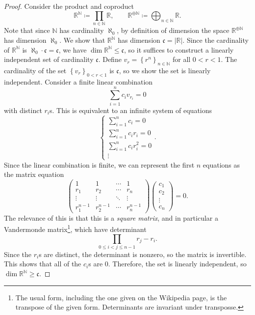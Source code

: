 \documentclass[11pt, letterpaper]{article}
\begin{document}
\begin{proof}
	Consider the product and coproduct
	\[
		\mathbb{R} ^\mathbb{N} \coloneqq \prod_{n\in\mathbb{N} } \mathbb{R} ,\qquad \mathbb{R} ^{\oplus \mathbb{N} } \coloneqq \bigoplus_{n\in\mathbb{N} } \mathbb{R} 
	.\]
	Note that since $\mathbb{N} $ has cardinality $\aleph_0$, by definition of dimension the space $\mathbb{R} ^{\oplus \mathbb{N}} $ has dimension $\aleph_0$. We show that $\mathbb{R} ^\mathbb{N}  $ has dimension $\mathfrak{c} =\left| \mathbb{R}  \right| $. Since the cardinality of $\mathbb{R} ^\mathbb{N} $ is $\aleph_0\cdot \mathfrak{c} =\mathfrak{c} $, we have $\dim \mathbb{R} ^\mathbb{N} \leq \mathfrak{c} $, so it suffices to construct a linearly independent set of cardinality $\mathfrak{c} $. Define $v_r=\left\{ r^n \right\}_{n\in\mathbb{N} } $ for all $0<r<1$. The cardinality of the set $\left\{ v_r \right\}_{0<r<1} $ is $\mathfrak{c} $, so we show the set is linearly independent. Consider a finite linear combination
	\[
		\sum_{i=1} ^n c_iv_{r_i} =0
	\]
	with distinct $r_i$s. This is equivalent to an infinite system of equations
	\[
		\begin{cases}
			\sum_{i=1} ^n c_i = 0\\
			\sum_{i=1} ^n c_ir_i = 0\\
			\sum_{i=1}^{n} c_ir_i^2=0\\
			\vdots
		\end{cases}
	.\]
	Since the linear combination is finite, we can represent the first $n$ equations as the matrix equation
	\[
		\begin{pmatrix}
		1 & 1 & \cdots & 1 \\
		r_1 & r_2 & \cdots & r_n \\
		\vdots & \vdots & \ddots & \vdots \\
		r_1^{n-1}  & r_2^{n-1}  & \cdots & r_n^{n-1} 
		\end{pmatrix}\begin{pmatrix}
		c_1 \\
		c_2 \\
		\vdots\\
		c_{n} 
		\end{pmatrix}=0
	.\]
	The relevance of this is that this is a \emph{square matrix}, and in particular a Vandermonde matrix\footnote{The usual form, including the one given on the Wikipedia page, is the transpose of the given form. Determinants are invariant under transposse.}, which have determinant
	\[
		\prod_{0\leq i<j \leq n-1} r_j-r_i
	.\]
	Since the $r_i$s are distinct, the determinant is nonzero, so the matrix is invertible. This shows that all of the $c_i$s are 0. Therefore, the set is linearly independent, so $\dim \mathbb{R} ^{\mathbb{N}  } \geq \mathfrak{c} $.


\end{proof}
\end{document}
